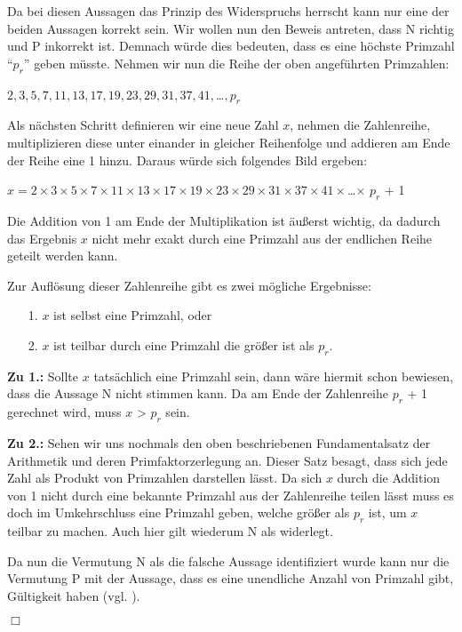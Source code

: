 \documentclass[12pt,a4paper]{article}
\theoremstyle{definition}
\begin{document}
Da bei diesen Aussagen das Prinzip des Widerspruchs herrscht kann nur eine der beiden Aussagen korrekt sein.
Wir wollen nun den Beweis antreten, dass N richtig und P inkorrekt ist.
Demnach würde dies bedeuten, dass es eine höchste Primzahl “$p_r$” geben müsste.
Nehmen wir nun die Reihe der oben angeführten Primzahlen:
\begin{center}
$2, 3, 5, 7, 11, 13, 17, 19, 23, 29, 31, 37, 41, $…$, p_r$
\end{center}

Als nächsten Schritt definieren wir eine neue Zahl $x$, nehmen die Zahlenreihe, multiplizieren diese unter einander in gleicher Reihenfolge und addieren am Ende der Reihe eine 1 hinzu.
Daraus würde sich folgendes Bild ergeben:

\begin{center}
$x = 2\times3\times5\times7\times11\times13\times17\times19\times23\times29\times31\times37\times41\times$…$\times$ $p_r$ + 1
\end{center}

Die Addition von 1 am Ende der Multiplikation ist äußerst wichtig, da dadurch das Ergebnis $x$ nicht mehr exakt durch eine Primzahl aus der endlichen Reihe geteilt werden kann.

Zur Auflösung dieser Zahlenreihe gibt es zwei mögliche Ergebnisse:
\begin{itemize}
\item[1.] $x$ ist selbst eine Primzahl, oder
\item[2.] $x$ ist teilbar durch eine Primzahl die größer ist als $p_r$.
\end{itemize}
\textbf{Zu 1.:} Sollte $x$ tatsächlich eine Primzahl sein, dann wäre hiermit schon bewiesen, dass die Aussage N nicht stimmen kann.
Da am Ende der Zahlenreihe $p_r$ + 1 gerechnet wird, muss $x$ > $p_r$ sein.

\textbf{Zu 2.:} Sehen wir uns nochmals den oben beschriebenen Fundamentalsatz der Arithmetik und deren Primfaktorzerlegung an.
Dieser Satz besagt, dass sich jede Zahl als Produkt von Primzahlen darstellen lässt.
Da sich $x$ durch die Addition von 1 nicht durch eine bekannte Primzahl aus der Zahlenreihe teilen lässt muss es doch im Umkehrschluss eine Primzahl geben, welche größer als $p_r$ ist, um $x$ teilbar zu machen.
Auch hier gilt wiederum N als widerlegt.

Da nun die Vermutung N als die falsche Aussage identifiziert wurde kann nur die Vermutung P mit der Aussage, dass es eine unendliche Anzahl von Primzahl gibt, Gültigkeit haben (vgl. \cite[3]{Ribenboim2006}).
\begin{flushright}
$\Box$
\end{flushright}
\end{document}
